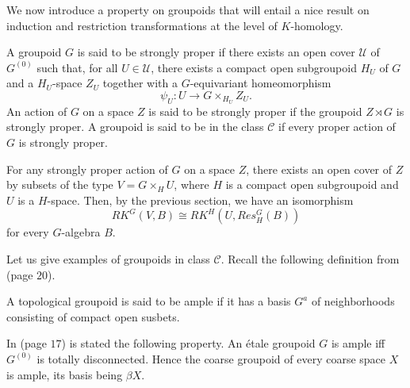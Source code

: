 We now introduce a property on groupoids that will entail a nice result on induction and restriction transformations at the level of $K$-homology.

\begin{definition}\label{StronglyProper}
A groupoid $G$ is said to be strongly proper if there exists an open cover $\mathcal U$ of $G^{(0)}$ such that, for all $U\in\mathcal U$, there exists a compact open subgroupoid $H_U$ of $G$ and a $H_U$-space $Z_U$ together with a $G$-equivariant homeomorphism
\[\psi_U : U \rightarrow G\times_{H_U} Z_U.\] 
An action of $G$ on a space $Z$ is said to be strongly proper if the groupoid $Z\rtimes G$ is strongly proper. A groupoid is said to be in the class $\mathcal C$ if every proper action of $G$ is strongly proper.
\end{definition}

\begin{rk}
For any strongly proper action of $G$ on a space $Z$, there exists an open cover of $Z$ by subsets of the type $V=G\times_H U$, where $H$ is a compact open subgroupoid and $U$ is a $H$-space. Then, by the previous section, we have an isomorphism
\[RK^G(V,B)\cong RK^H(U, Res_H^G (B))\]
for every $G$-algebra $B$. 
\end{rk}

Let us give examples of groupoids in class $\mathcal C$. Recall the following definition from \cite{Renault} (page $20$).

\begin{definition}
A topological groupoid is said to be ample if it has a basis $G^a$ of neighborhoods consisting of compact open susbets.
\end{definition}

In \cite{paterson} (page $17$) is stated the following property. An étale groupoid $G$ is ample iff $G^{(0)}$ is totally disconnected. Hence the coarse groupoid of every coarse space $X$ is ample, its basis being $\beta X$.

